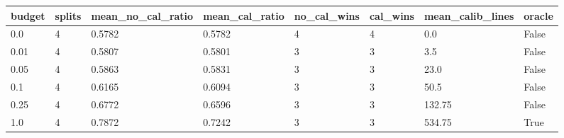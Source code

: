 \begin{tabular}{llllllll}
\toprule
budget & splits & mean\_no\_cal\_ratio & mean\_cal\_ratio & no\_cal\_wins & cal\_wins & mean\_calib\_lines & oracle \\
\midrule
0.0 & 4 & 0.5782 & 0.5782 & 4 & 4 & 0.0 & False \\
0.01 & 4 & 0.5807 & 0.5801 & 3 & 3 & 3.5 & False \\
0.05 & 4 & 0.5863 & 0.5831 & 3 & 3 & 23.0 & False \\
0.1 & 4 & 0.6165 & 0.6094 & 3 & 3 & 50.5 & False \\
0.25 & 4 & 0.6772 & 0.6596 & 3 & 3 & 132.75 & False \\
1.0 & 4 & 0.7872 & 0.7242 & 3 & 3 & 534.75 & True \\
\bottomrule
\end{tabular}
